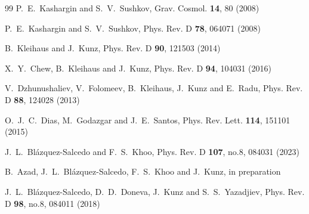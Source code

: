 \documentclass{article}
\begin{document}
\begin{small}
\begin{thebibliography}{99}
P.~E.~Kashargin and S.~V.~Sushkov,
Grav. Cosmol. \textbf{14}, 80 (2008)

P.~E.~Kashargin and S.~V.~Sushkov,
Phys. Rev. D \textbf{78}, 064071 (2008)

B.~Kleihaus and J.~Kunz,
Phys. Rev. D \textbf{90}, 121503 (2014)

X.~Y.~Chew, B.~Kleihaus and J.~Kunz,
Phys. Rev. D \textbf{94}, 104031 (2016)

V.~Dzhunushaliev, V.~Folomeev, B.~Kleihaus, J.~Kunz and E.~Radu,
Phys. Rev. D \textbf{88}, 124028 (2013)

O.~J.~C.~Dias, M.~Godazgar and J.~E.~Santos,
Phys. Rev. Lett. \textbf{114}, 151101 (2015)

J.~L.~Bl\'azquez-Salcedo and F.~S.~Khoo,
Phys. Rev. D \textbf{107}, no.8, 084031 (2023)

B.~Azad, J.~L.~Bl\'azquez-Salcedo, F.~S.~Khoo and J.~Kunz,
in preparation

J.~L.~Bl\'azquez-Salcedo, D.~D.~Doneva, J.~Kunz and S.~S.~Yazadjiev,
Phys. Rev. D \textbf{98}, no.8, 084011 (2018)


\end{thebibliography}
\end{small}
\end{document}
